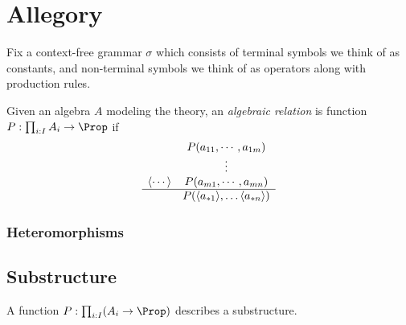 \chapter{Allegory}

Fix a context-free grammar $\sigma$ which consists of terminal symbols 
we think of as constants, and non-terminal symbols we think of as operators
along with production rules.


Given an algebra $A$ modeling the theory,
an \emph{algebraic relation} is function $P:\prod_{i:I} A_i\to \Prop$ if 
\begin{align*}
    \begin{array}{cc}
        & P(a_{11}, \cdots, a_{1m})\\
        & \vdots \\
        \langle\cdots\rangle & P(a_{m1}, \cdots, a_{mn})\\
    \hline
       & P(\langle a_{*1}\rangle,\ldots \langle a_{*n}\rangle)
    \end{array}
\end{align*}

\subsection{Heteromorphisms}


\section{Substructure}
A function $P:\prod_{i:I}(A_i\to \Prop)$ describes a substructure.
\begin{center}
\end{center}